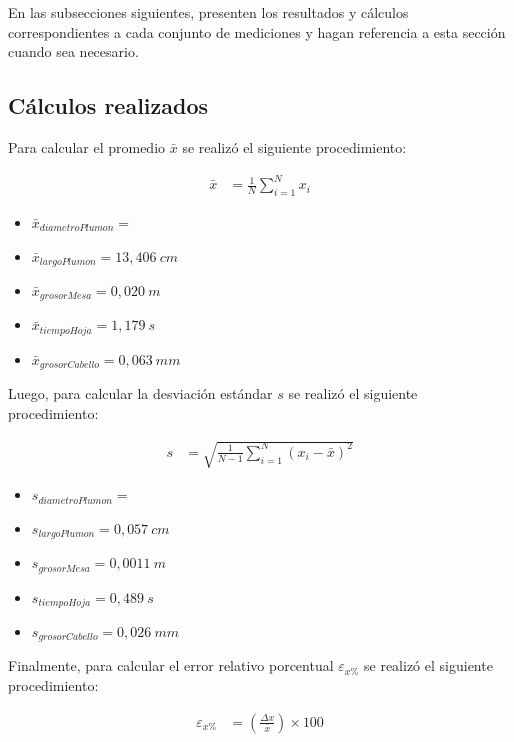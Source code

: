 \documentclass[12pt,a4paper]{article}
\begin{document}
 En las subsecciones siguientes, presenten los resultados y cálculos correspondientes a cada conjunto de mediciones y hagan referencia a esta sección cuando sea necesario.
\subsection{Cálculos realizados}

Para calcular el promedio $\bar{x}$ se realizó el siguiente procedimiento:

\begin{align*}
\bar{x} &= \frac{1}{N} \sum_{i=1}^{N} x_i 
\end{align*}

\begin{itemize}
\item $\bar{x}_{diametroPlumon} =  $
\item $\bar{x}_{largoPlumon} = 13,406~cm$
\item $\bar{x}_{grosorMesa} = 0,020~m$
\item $\bar{x}_{tiempoHoja} = 1,179~s$
\item $\bar{x}_{grosorCabello} = 0,063~mm $

\end{itemize}

\bigskip

Luego, para calcular la desviación estándar $s$ se realizó el siguiente procedimiento:

\begin{align*}
s &= \sqrt{\frac{1}{N-1} \sum_{i=1}^{N} (x_i - \bar{x})^2}
\end{align*}

\begin{itemize}
\item $s_{diametroPlumon}= $
\item $s_{largoPlumon}= 0,057~cm$
\item $s_{grosorMesa}= 0,0011~m$
\item $s_{tiempoHoja}= 0,489~s$
\item $s_{grosorCabello}= 0,026~mm$
\end{itemize}



Finalmente, para calcular el error relativo porcentual $\varepsilon_{x\%}$ se realizó el siguiente procedimiento:

\begin{align*}
\varepsilon_{x\%} &= \left(\frac{\Delta x}{\bar{x}}\right) \times 100
\end{align*}
\end{document}
